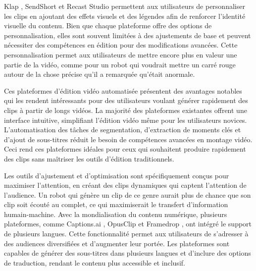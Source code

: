 Klap \cite{klap2024}, SendShort \cite{sendshort2024} et Recast Studio \cite{recast2024} permettent aux utilisateurs de personnaliser les clips en ajoutant des effets visuels et des légendes afin de renforcer l’identité visuelle du contenu. Bien que chaque plateforme offre des options de personnalisation, elles sont souvent limitées à des ajustements de base et peuvent nécessiter des compétences en édition pour des modifications avancées. Cette personnalisation permet aux utilisateurs de mettre encore plus en valeur une partie de la vidéo, comme pour un robot qui voudrait mettre un carré rouge autour de la chose précise qu’il a remarquée qu’était anormale.

Ces plateformes d’édition vidéo automatisée présentent des avantages notables qui les rendent intéressants pour des utilisateurs voulant générer rapidement des clips à partir de longs vidéos. La majorité des plateformes existantes offrent une interface intuitive, simplifiant l’édition vidéo même pour les utilisateurs novices. L’automatisation des tâches de segmentation, d’extraction de moments clés et d’ajout de sous-titres réduit le besoin de compétences avancées en montage vidéo. Ceci rend ces plateformes idéales pour ceux qui souhaitent produire rapidement des clips sans maîtriser les outils d’édition traditionnels.

Les outils d’ajustement et d’optimisation sont spécifiquement conçus pour maximiser l’attention, en créant des clips dynamiques qui captent l’attention de l’audience. Un robot qui génère un clip de ce genre aurait plus de chance que son clip soit écouté au complet, ce qui maximiserait le transfert d’information humain-machine. Avec la mondialisation du contenu numérique, plusieurs plateformes, comme Captions.ai \cite{captions2024}, OpusClip \cite{opusclip2024} et Framedrop \cite{framedrop2024}, ont intégré le support de plusieurs langues. Cette fonctionnalité permet aux utilisateurs de s’adresser à des audiences diversifiées et d’augmenter leur portée. Les plateformes sont capables de générer des sous-titres dans plusieurs langues et d’inclure des options de traduction, rendant le contenu plus accessible et inclusif.



